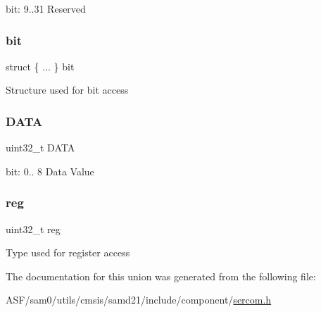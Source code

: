 bit\+: 9..31 Reserved \mbox{\label{union_s_e_r_c_o_m___s_p_i___d_a_t_a___type_a1cccdcee603c8b7d757355a548a350b2}} 
\subsubsection{\texorpdfstring{bit}{bit}}
{\footnotesize\ttfamily struct \{ ... \}   bit}

Structure used for bit access \mbox{\label{union_s_e_r_c_o_m___s_p_i___d_a_t_a___type_aad20077939fb7b9e145416f55028ea37}} 
\subsubsection{\texorpdfstring{DATA}{DATA}}
{\footnotesize\ttfamily uint32\+\_\+t D\+A\+TA}

bit\+: 0.. 8 Data Value \mbox{\label{union_s_e_r_c_o_m___s_p_i___d_a_t_a___type_a6b91636401516a477989a336376d7b40}} 
\subsubsection{\texorpdfstring{reg}{reg}}
{\footnotesize\ttfamily uint32\+\_\+t reg}

Type used for register access 

The documentation for this union was generated from the following file\+:\begin{DoxyCompactItemize}
\item 
A\+S\+F/sam0/utils/cmsis/samd21/include/component/\mbox{\hyperlink{utils_2cmsis_2samd21_2include_2component_2sercom_8h}{sercom.\+h}}\end{DoxyCompactItemize}
